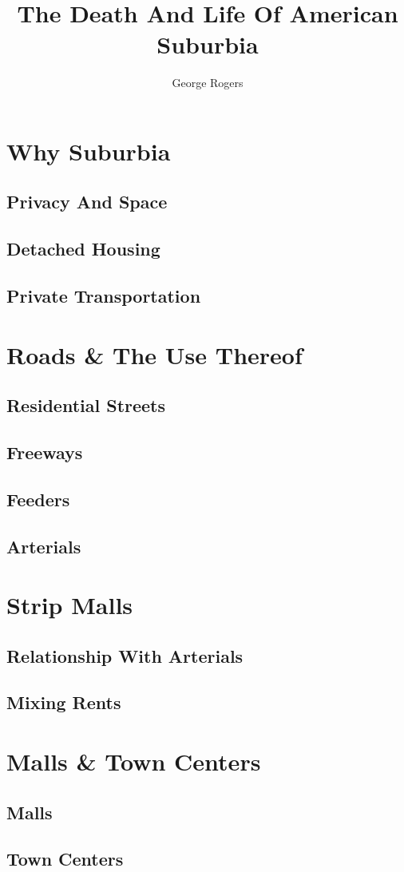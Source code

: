 \documentclass[openany]{amsbook}
\title{The Death And Life Of American Suburbia}
\author{George Rogers}
\begin{document}
\dominitoc
\maketitle

\tableofcontents
\chapter{Why Suburbia}
\minitoc
\section{Privacy And Space}
\section{Detached Housing}
\section{Private Transportation}
\chapter{Roads \& The Use Thereof}
\minitoc
\section{Residential Streets}
\section{Freeways}
\section{Feeders}
\section{Arterials}
\chapter{Strip Malls}
\minitoc
\section{Relationship With Arterials}
\section{Mixing Rents}
\chapter{Malls \& Town Centers}
\minitoc
\section{Malls}
\section{Town Centers}
\listoffigures
\end{document}
